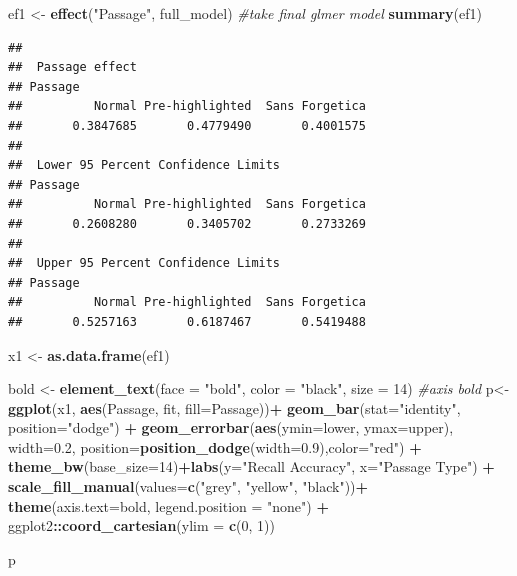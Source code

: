 \documentclass[pdf]{apa6}
\newenvironment{Shaded}{\begin{snugshade}}{\end{snugshade}}
\newcommand{\CommentTok}[1]{\textcolor[rgb]{0.56,0.35,0.01}{\textit{#1}}}
\newcommand{\DataTypeTok}[1]{\textcolor[rgb]{0.13,0.29,0.53}{#1}}
\newcommand{\DecValTok}[1]{\textcolor[rgb]{0.00,0.00,0.81}{#1}}
\newcommand{\FloatTok}[1]{\textcolor[rgb]{0.00,0.00,0.81}{#1}}
\newcommand{\KeywordTok}[1]{\textcolor[rgb]{0.13,0.29,0.53}{\textbf{#1}}}
\newcommand{\NormalTok}[1]{#1}
\newcommand{\OperatorTok}[1]{\textcolor[rgb]{0.81,0.36,0.00}{\textbf{#1}}}
\newcommand{\StringTok}[1]{\textcolor[rgb]{0.31,0.60,0.02}{#1}}
\begin{document}
\begin{Shaded}
\begin{Highlighting}[]
\NormalTok{ef1 <-}\StringTok{ }\KeywordTok{effect}\NormalTok{(}\StringTok{"Passage"}\NormalTok{, full_model) }\CommentTok{#take final glmer model }
\KeywordTok{summary}\NormalTok{(ef1)}
\end{Highlighting}
\end{Shaded}

\begin{verbatim}
## 
##  Passage effect
## Passage
##          Normal Pre-highlighted  Sans Forgetica 
##       0.3847685       0.4779490       0.4001575 
## 
##  Lower 95 Percent Confidence Limits
## Passage
##          Normal Pre-highlighted  Sans Forgetica 
##       0.2608280       0.3405702       0.2733269 
## 
##  Upper 95 Percent Confidence Limits
## Passage
##          Normal Pre-highlighted  Sans Forgetica 
##       0.5257163       0.6187467       0.5419488
\end{verbatim}

\begin{Shaded}
\begin{Highlighting}[]
\NormalTok{x1 <-}\StringTok{ }\KeywordTok{as.data.frame}\NormalTok{(ef1)}

\NormalTok{bold <-}\StringTok{ }\KeywordTok{element_text}\NormalTok{(}\DataTypeTok{face =} \StringTok{"bold"}\NormalTok{, }\DataTypeTok{color =} \StringTok{"black"}\NormalTok{, }\DataTypeTok{size =} \DecValTok{14}\NormalTok{) }\CommentTok{#axis bold}
\NormalTok{p<-}\StringTok{ }\KeywordTok{ggplot}\NormalTok{(x1, }\KeywordTok{aes}\NormalTok{(Passage, fit, }\DataTypeTok{fill=}\NormalTok{Passage))}\OperatorTok{+}\StringTok{ }
\StringTok{  }\KeywordTok{geom_bar}\NormalTok{(}\DataTypeTok{stat=}\StringTok{"identity"}\NormalTok{, }\DataTypeTok{position=}\StringTok{"dodge"}\NormalTok{) }\OperatorTok{+}\StringTok{ }
\StringTok{  }\KeywordTok{geom_errorbar}\NormalTok{(}\KeywordTok{aes}\NormalTok{(}\DataTypeTok{ymin=}\NormalTok{lower, }\DataTypeTok{ymax=}\NormalTok{upper), }\DataTypeTok{width=}\FloatTok{0.2}\NormalTok{, }\DataTypeTok{position=}\KeywordTok{position_dodge}\NormalTok{(}\DataTypeTok{width=}\FloatTok{0.9}\NormalTok{),}\DataTypeTok{color=}\StringTok{"red"}\NormalTok{) }\OperatorTok{+}\StringTok{ }\KeywordTok{theme_bw}\NormalTok{(}\DataTypeTok{base_size=}\DecValTok{14}\NormalTok{)}\OperatorTok{+}\KeywordTok{labs}\NormalTok{(}\DataTypeTok{y=}\StringTok{"Recall Accuracy"}\NormalTok{, }\DataTypeTok{x=}\StringTok{"Passage Type"}\NormalTok{) }\OperatorTok{+}\StringTok{ }
\StringTok{  }\KeywordTok{scale_fill_manual}\NormalTok{(}\DataTypeTok{values=}\KeywordTok{c}\NormalTok{(}\StringTok{"grey"}\NormalTok{, }\StringTok{"yellow"}\NormalTok{, }\StringTok{"black"}\NormalTok{))}\OperatorTok{+}
\StringTok{  }\KeywordTok{theme}\NormalTok{(}\DataTypeTok{axis.text=}\NormalTok{bold, }\DataTypeTok{legend.position =} \StringTok{"none"}\NormalTok{) }\OperatorTok{+}\StringTok{ }\NormalTok{ggplot2}\OperatorTok{::}\KeywordTok{coord_cartesian}\NormalTok{(}\DataTypeTok{ylim =} \KeywordTok{c}\NormalTok{(}\DecValTok{0}\NormalTok{, }\DecValTok{1}\NormalTok{))}

\NormalTok{p }
\end{Highlighting}
\end{Shaded}
\end{document}
